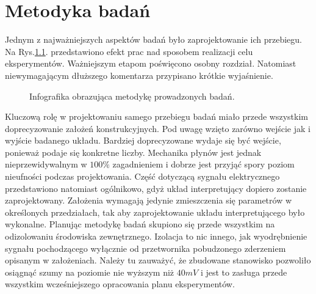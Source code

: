 \chapter{Metodyka badań}
\label{sec:exp_methods}
Jednym z najważniejszych aspektów badań było zaprojektowanie ich przebiegu. 
 Na Rys.\ref{fig:workflow}. 
 przedstawiono efekt prac nad sposobem realizacji celu eksperymentów. 
 Ważniejszym etapom poświęcono osobny rozdział. Natomiast niewymagającym dłuższego
 komentarza przypisano krótkie wyjaśnienie. 

\begin{figure}[htbp]
\centering
{}
\caption{Infografika obrazująca metodykę prowadzonych badań.}
\label{fig:workflow}
\end{figure}

\indent Kluczową rolę w projektowaniu samego przebiegu badań miało przede wszystkim
doprecyzowanie założeń konstrukcyjnych. Pod uwagę wzięto zarówno wejście jak i wyjście
badanego układu. Bardziej doprecyzowane wydaje się być wejście, ponieważ podaje się 
konkretne liczby. Mechanika płynów jest jednak nieprzewidywalnym w $100\%$ zagadnieniem
i dobrze jest przyjąć spory poziom nieufności podczas projektowania. Część dotyczącą
sygnału elektrycznego przedstawiono natomiast ogólnikowo, gdyż układ interpretujący
dopiero zostanie zaprojektowany. Założenia wymagają jedynie zmieszczenia się
parametrów w określonych przedziałach, tak aby zaprojektowanie układu interpretującego
było wykonalne.
\indent Planując metodykę badań skupiono się przede wszystkim na odizolowaniu
środowiska zewnętrznego. Izolacja to nic innego, jak wyodrębnienie sygnału pochodzącego
wyłącznie od przetwornika pobudzonego zderzeniem opisanym w założeniach. Należy tu 
zauważyć, że zbudowane stanowisko pozwoliło osiągnąć szumy na poziomie nie wyższym niż
$40 mV$ i jest to zasługa przede wszystkim wcześniejszego opracowania planu eksperymentów.
